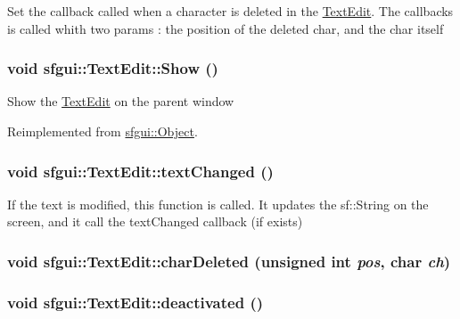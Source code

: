 Set the callback called when a character is deleted in the \hyperlink{classsfgui_1_1TextEdit}{TextEdit}. The callbacks is called whith two params : the position of the deleted char, and the char itself \hypertarget{classsfgui_1_1TextEdit_1ee03247816213b34caaff365b160de0}{
\subsubsection[Show]{\setlength{\rightskip}{0pt plus 5cm}void sfgui::TextEdit::Show ()}}
\label{classsfgui_1_1TextEdit_1ee03247816213b34caaff365b160de0}




Show the \hyperlink{classsfgui_1_1TextEdit}{TextEdit} on the parent window 

Reimplemented from \hyperlink{classsfgui_1_1Object_cdf7f9b5f731e49e0e13e55de704805d}{sfgui::Object}.\hypertarget{classsfgui_1_1TextEdit_04bf790d96e0014479cc791691ecbade}{
\subsubsection[textChanged]{\setlength{\rightskip}{0pt plus 5cm}void sfgui::TextEdit::textChanged ()}}
\label{classsfgui_1_1TextEdit_04bf790d96e0014479cc791691ecbade}




If the text is modified, this function is called. It updates the sf::String on the screen, and it call the textChanged callback (if exists) \hypertarget{classsfgui_1_1TextEdit_8c3d822835999b2b0a38c1ef95eca4ff}{
\subsubsection[charDeleted]{\setlength{\rightskip}{0pt plus 5cm}void sfgui::TextEdit::charDeleted (unsigned int {\em pos}, \/  char {\em ch})}}
\label{classsfgui_1_1TextEdit_8c3d822835999b2b0a38c1ef95eca4ff}


\hypertarget{classsfgui_1_1TextEdit_c5ff761e3933294b46892db32e62b9f6}{
\subsubsection[deactivated]{\setlength{\rightskip}{0pt plus 5cm}void sfgui::TextEdit::deactivated ()}}
\label{classsfgui_1_1TextEdit_c5ff761e3933294b46892db32e62b9f6}


